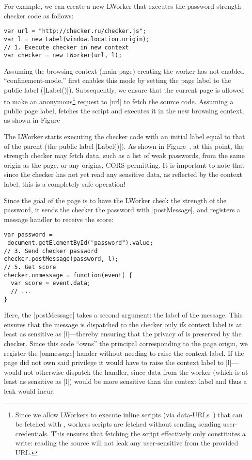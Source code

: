 For example, we can create a new LWorker that executes the
password-strength checker code as follows:
\begin{lstlisting}
var url = "http://checker.ru/checker.js";
var l = new Label(window.location.origin);
// 1. Execute checker in new context
var checker = new LWorker(url, l);
\end{lstlisting}
%
Assuming the browsing context (main page) creating the worker has not
enabled ``confinement-mode,'' \sys{} first enables this mode by
setting the page label to the public label (\js|Label()|).
%
Subsequently, we ensure that the current page is allowed to make an
anonymous\footnote{
  Since we allow LWorkers to execute inline scripts (via
  data-URLs~) that can be fetched with \xhr{}, workers
  scripts are fetched without sending sending user-credentials.
  This ensures that fetching the script effectively only constitutes a
  write: reading the source will not leak any user-sensitive from the
  provided URL.
} request to \js|url| to fetch the source code.
%
Assuming a public page label, \sys{} fetches the script and executes
it in the new browsing context, as shown in
Figure~

The LWorker starts executing the checker code with an initial label
equal to that of the parent (the public label \js|Label()|).
%
As shown in Figure~, at this point, the strength
checker may fetch data, such as a list of weak passwords, from the
same origin as the page, or any origins, CORS-permitting.
%
It is important to note that since the checker has not yet read any
sensitive data, as reflected by the context label, this is a
completely safe operation!

Since the goal of the page is to have the LWorker check the strength
of the password, it sends the checker the password with
\js|postMessage|, and registers a message handler to receive the
score:
\begin{lstlisting}
var password = 
 document.getElementById("password").value;
// 3. Send checker password 
checker.postMessage(password, l);
// 5. Get score
checker.onmessage = function(event) {
  var score = event.data; 
  // ...
}
\end{lstlisting}
Here, the \js|postMessage| takes a second argument: the label of the
message.
%
This ensures that the message is dispatched to the checker only ifs
context label is at least as sensitive as \js|l|---thereby ensuring
that the privacy of  is preserved by the checker.
%
Since this code ``owns'' the principal corresponding to the page
origin, we register the \js|onmessage| hander without needing to raise
the context label. If the page did not own said privilege it would
have to raise the context label to \js|l|---\sys{} would not otherwise
dispatch the handler, since data from the worker (which is at least as
sensitive as \js|l|) would be more sensitive than the context label
and thus a leak would incur.


